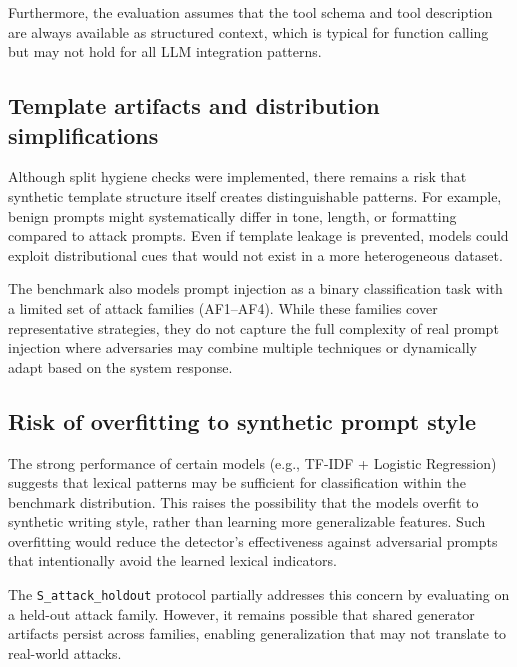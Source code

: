 Furthermore, the evaluation assumes that the tool schema and tool description are always available as structured context, which is typical for function calling but may not hold for all LLM integration patterns.

\subsection{Template artifacts and distribution simplifications}
Although split hygiene checks were implemented, there remains a risk that synthetic template structure itself creates distinguishable patterns. For example, benign prompts might systematically differ in tone, length, or formatting compared to attack prompts. Even if template leakage is prevented, models could exploit distributional cues that would not exist in a more heterogeneous dataset.

The benchmark also models prompt injection as a binary classification task with a limited set of attack families (AF1--AF4). While these families cover representative strategies, they do not capture the full complexity of real prompt injection where adversaries may combine multiple techniques or dynamically adapt based on the system response.

\subsection{Risk of overfitting to synthetic prompt style}
The strong performance of certain models (e.g., TF-IDF + Logistic Regression) suggests that lexical patterns may be sufficient for classification within the benchmark distribution. This raises the possibility that the models overfit to synthetic writing style, rather than learning more generalizable features. Such overfitting would reduce the detector's effectiveness against adversarial prompts that intentionally avoid the learned lexical indicators.

The \texttt{S\_attack\_holdout} protocol partially addresses this concern by evaluating on a held-out attack family. However, it remains possible that shared generator artifacts persist across families, enabling generalization that may not translate to real-world attacks.

